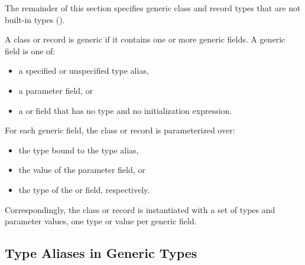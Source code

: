 The remainder of this section  specifies generic
class and record types that are not built-in types
().

A class or record is generic if it contains one or more
generic fields. A generic field is one of:
\begin{itemize}
\item a specified or unspecified type alias,
\item a parameter field, or
\item a  or  field that has no type and no initialization
expression.
\end{itemize}

For each generic field, the class or record is parameterized over:
\begin{itemize}
\item the type bound to the type alias,
\item the value of the parameter field, or
\item the type of the  or  field, respectively.
\end{itemize}
Correspondingly, the class or record is instantiated with a set
of types and parameter values, one type or value per generic field.

%
%

\subsection{Type Aliases in Generic Types}
\label{Type_Aliases_in_Generic_Types}


